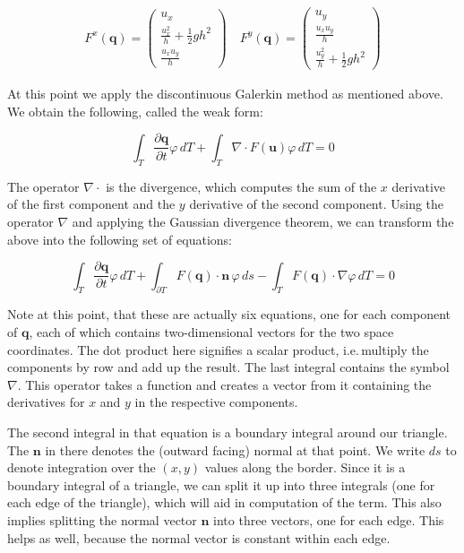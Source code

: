 \documentclass{article}
\newcommand{\pd}[2]{\dfrac{\partial #1}{\partial #2}}
\renewcommand{\phi}{\varphi}
\begin{document}
\begin{eqnarray*}
  F^x(\mathbf{q}) =
  \begin{pmatrix}
    u_x \\ \frac{u_x^2}{h} + \frac{1}{2} g h^2 \\ \frac{u_x u_y}{h}
  \end{pmatrix}
  \quad
  F^y(\mathbf{q}) =
  \begin{pmatrix}
    u_y \\ \frac{u_x u_y}{h} \\ \frac{u_y^2}{h} + \frac{1}{2} g h^2
  \end{pmatrix}
\end{eqnarray*}

At this point we apply the discontinuous Galerkin method as mentioned above. We obtain the following, called the weak form:

\begin{equation}
  \label{eq:shallow-water-weak-form}
  \int_T \pd{\mathbf{q}}{t} \phi \,dT + \int_T \nabla \cdot F(\mathbf{u}) \phi \,dT = 0
\end{equation}

The operator $\nabla \cdot$ is the divergence, which computes the sum of the $x$ derivative of the first component and the $y$ derivative of the second component. Using the operator $\nabla$ and applying the Gaussian divergence theorem, we can transform the above into the following set of equations:

\begin{equation}
  \label{eq:shallow-water-weak-form-div-applied}
  \int_T \pd {\mathbf{q}}{t} \phi \, dT +
  \int_{\partial T} F(\mathbf{q}) \cdot \mathbf{n} \, \phi \, ds -
  \int_T F(\mathbf{q}) \cdot \nabla \phi \, dT = 0
\end{equation}

Note at this point, that these are actually six equations, one for each component of $\mathbf{q}$, each of which contains two-dimensional vectors for the two space coordinates. The dot product here signifies a scalar product, i.e.\,multiply the components by row and add up the result. The last integral contains the symbol $\nabla$. This operator takes a function and creates a vector from it containing the derivatives for $x$ and $y$ in the respective components.

The second integral in that equation is a boundary integral around our triangle. The $\mathbf{n}$ in there denotes the (outward facing) normal at that point. We write $ds$ to denote integration over the $(x,y)$ values along the border. Since it is a boundary integral of a triangle, we can split it up into three integrals (one for each edge of the triangle), which will aid in computation of the term. This also implies splitting the normal vector $\mathbf{n}$ into three vectors, one for each edge. This helps as well, because the normal vector is constant within each edge.
\end{document}
